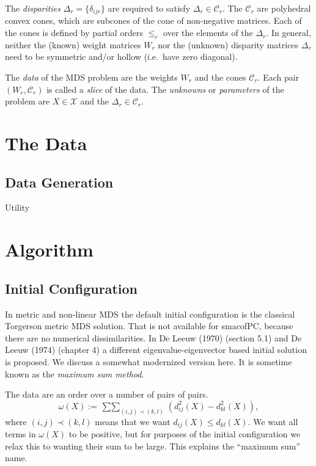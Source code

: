 \documentclass[
  12pt,
]{article}
\begin{document}
The \emph{disparities} \(\Delta_r=\{\delta_{ijr}\}\) are required to satisfy \(\Delta_r\in\mathcal{C}_r\). The \(\mathcal{C}_r\) are polyhedral convex cones, which are subcones of the cone of non-negative matrices. Each of the cones is defined by partial orders \(\leq_r\) over the elements of the \(\Delta_r\). In general, neither the (known) weight matrices \(W_r\) nor the (unknown) disparity matrices \(\Delta_r\) need to be symmetric and/or hollow (i.e.~have zero diagonal).

The \emph{data} of the MDS problem are the weights \(W_r\) and the cones \(\mathcal{C}_r\). Each pair \((W_r,\mathcal{C}_r)\) is called a \emph{slice} of the data. The \emph{unknowns} or \emph{parameters} of the problem are \(X\in\mathcal{X}\) and the \(\Delta_r\in\mathcal{C}_r\).

\section{The Data}\label{the-data}

\subsection{Data Generation}\label{data-generation}

Utility

\section{Algorithm}\label{algorithm}

\subsection{Initial Configuration}\label{initial-configuration}

In metric and non-linear MDS the default initial configuration is the
classical Torgerson metric MDS solution. That is not available for
smacofPC, because there are no numerical dissimilarities. In
De Leeuw (1970) (section 5.1) and De Leeuw (1974) (chapter 4) a different eigenvalue-eigenvector based initial solution is proposed. We discuss a somewhat modernized version here. It is sometime known as the \emph{maximum sum method}.

The data are an order over a number of pairs of pairs.
\begin{equation}
\omega(X):=\mathop{\sum\sum}_{(i,j)\prec(k,l)}(d_{ij}^2(X)-d_{kl}^2(X)),
\label{eq:omegadef}
\end{equation}
where \((i,j)\prec(k,l)\) means that we want \(d_{ij}(X)\leq d_{kl}(X)\).
We want all terms in \(\omega(X)\) to be positive, but for purposes of
the initial configuration we relax this to wanting their sum to be
large. This explains the ``maximum sum'' name.
\end{document}
